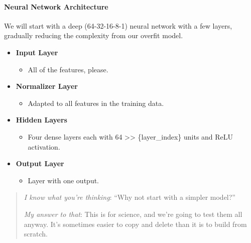 \documentclass[11pt]{article}
\providecommand{\tightlist}{%
      \setlength{\itemsep}{0pt}\setlength{\parskip}{0pt}}
\begin{document}
\paragraph{Neural Network
Architecture}\label{neural-network-architecture}

We will start with a deep (64-32-16-8-1) neural network with a few
layers, gradually reducing the complexity from our overfit model.

\begin{itemize}
\tightlist
\item
  \textbf{Input Layer}

  \begin{itemize}
  \tightlist
  \item
    All of the features, please.
  \end{itemize}
\item
  \textbf{Normalizer Layer}

  \begin{itemize}
  \tightlist
  \item
    Adapted to all features in the training data.
  \end{itemize}
\item
  \textbf{Hidden Layers}

  \begin{itemize}
  \tightlist
  \item
    Four dense layers each with 64 \textgreater\textgreater{}
    \{layer\_index\} units and ReLU activation.
  \end{itemize}
\item
  \textbf{Output Layer}

  \begin{itemize}
  \tightlist
  \item
    Layer with one output.
  \end{itemize}
\end{itemize}

\begin{quote}
\emph{I know what you're thinking}: ``Why not start with a simpler
model?''

\emph{My answer to that}: This is for science, and we're going to test
them all anyway. It's sometimes easier to copy and delete than it is to
build from scratch.
\end{quote}
\end{document}
